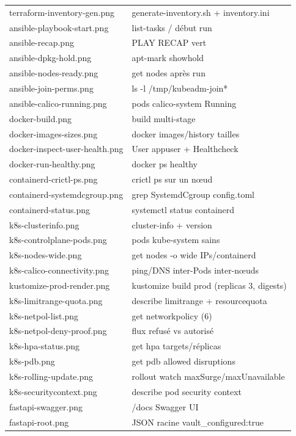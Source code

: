 \documentclass[12pt,a4paper,twoside,openright]{report}
\begin{document}
{\begin{longtable}{@{}p{5.6cm}p{9.4cm}@{}}
terraform-inventory-gen.png & generate-inventory.sh + inventory.ini \\
ansible-playbook-start.png & list-tasks / début run \\
ansible-recap.png & PLAY RECAP vert \\
ansible-dpkg-hold.png & apt-mark showhold \\
ansible-nodes-ready.png & get nodes après run \\
ansible-join-perms.png & ls -l /tmp/kubeadm-join* \\
ansible-calico-running.png & pods calico-system Running \\
docker-build.png & build multi-stage \\
docker-images-sizes.png & docker images/history tailles \\
docker-inspect-user-health.png & User appuser + Healthcheck \\
docker-run-healthy.png & docker ps healthy \\
containerd-crictl-ps.png & crictl ps sur un nœud \\
containerd-systemdcgroup.png & grep SystemdCgroup config.toml \\
containerd-status.png & systemctl status containerd \\
k8s-clusterinfo.png & cluster-info + version \\
k8s-controlplane-pods.png & pods kube-system sains \\
k8s-nodes-wide.png & get nodes -o wide IPs/containerd \\
k8s-calico-connectivity.png & ping/DNS inter-Pods inter-nœuds \\
kustomize-prod-render.png & kustomize build prod (replicas 3, digests) \\
k8s-limitrange-quota.png & describe limitrange + resourcequota \\
k8s-netpol-list.png & get networkpolicy (6) \\
k8s-netpol-deny-proof.png & flux refusé vs autorisé \\
k8s-hpa-status.png & get hpa targets/réplicas \\
k8s-pdb.png & get pdb allowed disruptions \\
k8s-rolling-update.png & rollout watch maxSurge/maxUnavailable \\
k8s-securitycontext.png & describe pod security context \\
fastapi-swagger.png & /docs Swagger UI \\
fastapi-root.png & JSON racine vault\_configured:true \\

\end{longtable}}
\end{document}

